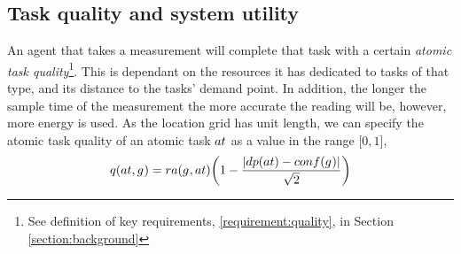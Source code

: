 \newcommand{\functionAtomicTaskQualitySignature}[2]{
	\functionSignature{q} {\varAtomicTask{}{}, \varAgent{}{}}
}
\newcommand{\functionCompositeTaskValue}[2]{
	\functionSignature{ctv}{\varAtomicTask{}{}}
}

\newcommand{\functionSystemUtility}[2]{\functionSignature{u}{\setTime{}{}}}
\newcommand{\functionCompositeTaskQuality}[2]{
	\functionSignature{taq_\varTime{}{}}{\varCompositeTask{}{}}
}
\newcommand{\functionTaskAbsoluteValue}[2]{
	\functionSignature{atv}{\varCompositeTask{}{}, \varAtomicTask{}{}}
}

\newcommand{\functionRelativeDistance}[2]{
	\functionSignature{dist}{\varAtomicTask{}{}, \varAgent{}{}}
}
\subsection{Task quality and system utility}
\label{section:task_quality}

An agent that takes a measurement will complete that task with a certain \textit{atomic task quality}\footnote{See definition of key requirements, \ref{requirement:quality}, in Section \ref{section:background}}. This is dependant on the resources it has dedicated to tasks of that type, and its distance to the tasks' demand point.  In addition, the longer the sample time of the measurement the more accurate the reading will be, however,  more energy is used. As the location grid has unit length, we can specify the atomic task quality of an atomic task $\varAtomicTask{}{}$ as a value in the range $\lbrack 0, 1 \rbrack$,
\begin{equation}
	\label{eq:atomic_task_quality}
	\functionAtomicTaskQualitySignature{}{} = 
	{\functionTaskResourceAllocation{}{}}
	\bigg ( 1 - \frac{\funcSize{
			\functionTaskDemandPoint{}{} - \functionDeployment{\varAgent{}{}}{} 
		}{}}{{\sqrt{2}}}\bigg )
\end{equation}


